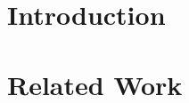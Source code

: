 \documentclass[letterpaper]{article} %
\begin{document}
\section{Introduction}


\section{Related Work}
\end{document}
